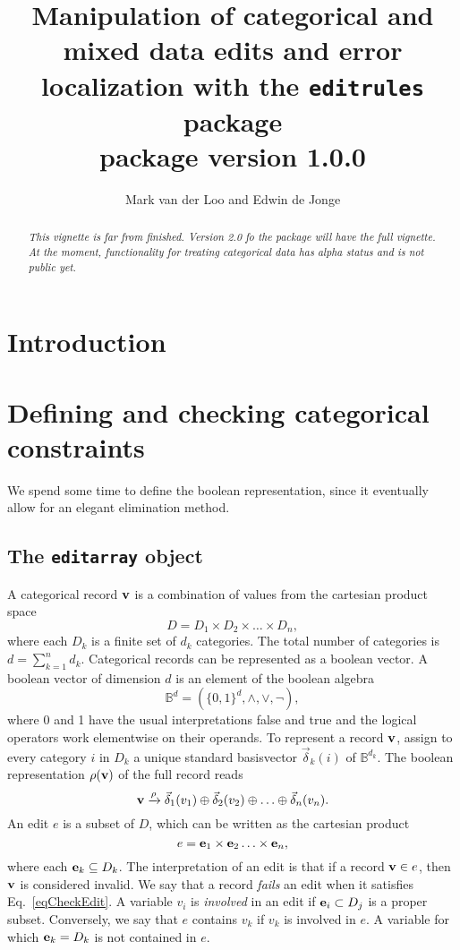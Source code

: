 \documentclass[11pt, fleqn, a4paper]{article}
\title{Manipulation of categorical and mixed data edits and error localization with the {\tt editrules} package\\
{\small package version 1.0.0}}
\author{Mark van der Loo and Edwin de Jonge}
\begin{document}
\maketitle
\begin{abstract}
{\em This vignette is far from finished. Version 2.0 fo the package will have
the full vignette. At the moment, functionality for treating categorical data has alpha status and is not public yet.}
\end{abstract}

\newpage
\tableofcontents
\newpage

\section{Introduction}


\section{Defining and checking categorical constraints}
We spend some time to define the boolean representation, since it eventually allow for an elegant
elimination method.
\subsection{The {\tt editarray} object}
A categorical record ${\bf v}$ is a combination of values from the
cartesian product space
\begin{equation}
    D = D_1\times D_2\times\ldots\times D_n,
\end{equation}
where each $D_k$ is a finite set of $d_k$ categories. The total number of
categories is $d = \sum_{k=1}^n d_k$.
Categorical records can be represented as  a boolean vector. A boolean
vector of dimension $d$ is an element of the boolean algebra 
\begin{equation}
\mathbb{B}^{d}=\left(\{0,1\}^{d},\land,\lor,\lnot\right),
\end{equation}
where 0 and 1 have the usual interpretations {\sc false} and {\sc true} and the
logical operators work elementwise on their operands. To represent a record
${\bf v}$, assign to every category $i$ in $D_k$ a unique standard 
basisvector $\vec{\delta}_k(i)$ of $\mathbb{B}^{d_k}$. 
The boolean representation $\rho({\bf v})$ of the full record reads
%
\begin{equation}
    {\bf v} \xrightarrow{\rho} \vec{\delta}_{1}(v_1)\oplus\vec{\delta}_{2}(v_2)\oplus\ldots\oplus\vec{\delta}_n(v_n).
\end{equation}
An edit $e$ is a subset of $D$, which can be written as the cartesian product
\begin{equation}
    e = {\bf e}_1\times{\bf e}_2\ldots\times{\bf e}_n,
\end{equation}
where each ${\bf e}_k\subseteq D_k$.  The interpretation of an edit is that if
a record ${\bf v}\in e$, then ${\bf v}$ is considered invalid.  We say that a
record {\em fails} an edit when it satisfies Eq.\ \eqref{eqCheckEdit}.  A
variable $v_i$ is {\em involved} in an edit if ${\bf e}_i\subset D_j$ is a
proper subset.  Conversely, we say that $e$ contains $v_k$ if $v_k$ is involved
in $e$. A variable for which ${\bf e}_k=D_k$ is not contained in $e$.
\end{document}
